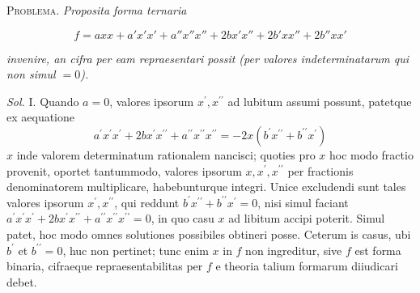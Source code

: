 \textsc{Problema.} \textit{Proposita forma ternaria}

\[f=axx+a'x'x'+a''x''x''+2bx'x''+2b'xx''+2b''xx'\]

\textit{invenire, an cifra per eam repraesentari possit (per valores indeterminatarum qui non simul \(=0\)).}

\textit{Sol.} I. Quando \(a=0\), valores ipsorum \(x^\prime,x^{\prime\prime}\) ad lubitum assumi possunt, patetque ex aequatione 
\[a^\prime x^\prime x^\prime+2b x^\prime x^{\prime\prime}+a^{\prime\prime}x^{\prime\prime}x^{\prime\prime}=-2x(b^\prime x^{\prime\prime}+b^{\prime\prime}x^\prime)\]
 \(x\) inde valorem determinatum rationalem nancisci; quoties pro \(x\) hoc modo fractio provenit, oportet tantummodo, valores ipsorum \(x,x^\prime,x^{\prime\prime}\) per fractionis denominatorem multiplicare, habebunturque integri. Unice excludendi sunt tales valores ipsorum \(x^\prime,x^{\prime\prime}\), qui reddunt \(b^\prime x^{\prime\prime}+b^{\prime\prime}x^\prime=0\), nisi simul faciant \(a^\prime x^\prime x^\prime+2b x^\prime x^{\prime\prime}+a^{\prime\prime}x^{\prime\prime}x^{\prime\prime}=0\), in quo casu \(x\) ad libitum accipi poterit. Simul patet, hoc modo omnes solutiones possibiles obtineri posse. Ceterum is casus, ubi \(b^\prime\) et \(b^{\prime\prime}=0\), huc non pertinet; tunc enim \(x\) in \(f\) non ingreditur, sive \(f\) est forma binaria, cifraeque repraesentabilitas per \(f\) e theoria talium formarum diiudicari debet.

